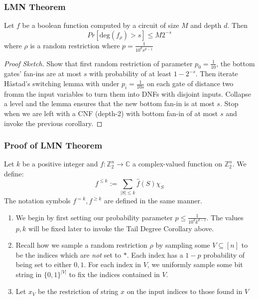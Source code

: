 \documentclass{beamer}
\begin{document}
\begin{frame}
  \frametitle{LMN Theorem}
  \begin{corollary} \label{fouriertail}
    Let $f$ be a boolean function computed by a circuit of size $M$ and depth $d$. Then
    $$ Pr[\text{deg}(f_{\rho}) > s] \leq M2^{-s} $$
    where $\rho$ is a random restriction where $p = \frac{1}{10^ds^{d-1}}$
  \end{corollary}
  \pause
  \begin{proof}[Proof Sketch]
    Show that first random restriction of parameter $p_0 = \frac{1}{10}$, the bottom gates' fan-ins are at most $s$ with probability of at least $1 - 2^{-s}$. Then iterate H\aa stad's switching lemma with under $p_i = \frac{1}{10s}$ on each gate of distance two fromm the input variables to turn them into DNFs with disjoint inputs. Collapse a level and the lemma ensures that the new bottom fan-in is at most $s$. Stop when we are left with a CNF (depth-2) with bottom fan-in of at most $s$ and invoke the previous corollary.
  \end{proof}
\end{frame}

\begin{frame}
  \frametitle{Proof of LMN Theorem}
  \begin{definition}
    Let $k$ be a positive integer and $f:\mathbb{Z}_2^n \rightarrow \mathbb{C}$ a complex-valued function on $\mathbb{Z}_2^n$. We define: \newline
    $$f^{\leq k} := \sum_{|S| \leq k} \hat{f}(S)\chi_{S} $$
    The notation symbols $f^{=k},f^{\geq k}$ are defined in the same manner.
  \end{definition}
  \pause
  \begin{enumerate}
    \item We begin by first setting our probability parameter $p \leq \frac{1}{10^dk^{d-1}}$. The values $p, k$ will be fixed later to invoke the Tail Degree Corollary above.
    \pause
    \item
    Recall how we sample a random restriction $\rho$ by sampling some $V \subseteq [n]$ to be the indices which are \emph{not} set to $*$. Each index has a $1-p$ probability of being set to either $0,1$. For each index in $V$, we uniformly sample some bit string in $\{0,1\}^{|V|}$ to fix the indices contained in $V$.
    \pause
    \item Let $x_{V}$ be the restriction of string $x$ on the input indices to those found in $V$
  \end{enumerate}
\end{frame}
\end{document}
